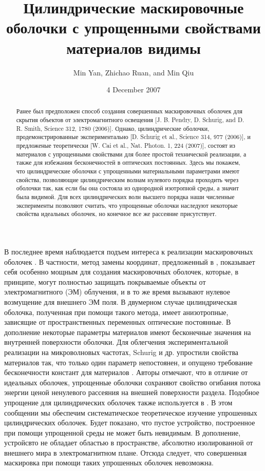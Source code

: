 \documentclass[12pt]{article}
\title{Цилиндрические маскировочные оболочки с упрощенными свойствами
  материалов видимы}
\author{Min Yan, Zhichao Ruan, and Min Qiu}
\date{4 December 2007}
\begin{document}
\maketitle
\begin{abstract}
  Ранее был предположен способ создания совершенных маскировочных оболочек
  для скрытия объектов от электромагнитного освещения [J. B. Pendry,
    D. Schurig, and D. R. Smith, Science 312, 1780 (2006)]. Однако,
  цилиндрические оболочки, продемонстрированные экспериментально [D. Schurig et
    al., Science 314, 977 (2006)], и предложеные теоретически [W. Cai
    et al., Nat. Photon. 1, 224 (2007)], состоят из материалов с
  упрощенными свойствами для более простой технической реализации, а
  также для избежания бесконечностей в оптических постоянных. Здесь мы
  покажем, что цилиндрические оболочки с упрощенными материальными параметрами
   имеют свойства,
  позволяющие цилиндрическим волнам нулевого порядка проходить через оболочки так,
  как если бы она состояла из однородной изотропной среды, а значит была
  видимой. Для всех цилиндрических волн высшего порядка наши численные
  эксперименты позволяют считать, что упрощенные оболочки наследуют
  некоторые свойства идеальных оболочек, но конечное все же рассеяние
  присутствует.
\end{abstract}

В последнее время наблюдается подъем интереса к реализации
маскировочных оболочек \cite{1, 2, 3, 4, 5, 6, 7, 8}. В частности,
метод замены координат, предложенный в \cite{4}, показывает себя
особенно мощным для создания маскировочных оболочек, которые, в
принципе, могут полностью защищать покрываемые объекты от
электромагнитного (ЭМ) облучения, и в то же время вызывают нулевое
возмущение для внешнего ЭМ поля. В двумерном случае цилиндрическая
оболочка, полученная при помощи такого метода, имеет анизотропные,
зависящие от пространственных переменных оптические постоянные. В
дополнение некоторые параметры материалов имеют бесконечные значения
на внутренней поверхности оболочки. Для облегчения экспериментальной
реализации на микроволновых частотах, Schurig и др. упростили свойства
материалов так, что только один параметр непостоянен, и опущено требование
бесконечности констант для материалов \cite{9}. Авторы отмечают,
что в отличие от идеальных оболочек, упрощенные оболочки сохраняют
свойство огибания потока энергии ценой ненулевого рассеяния на внешней
поверхности раздела. Подобное упрощение для цилиндрических оболочек
также используется в \cite{10}. В этом сообщении мы обеспечим
систематическое теоретическое изучение упрошенных цилиндрических
оболочек. Будет показано, что пустое устройство, построенное при
помощи упрощенной среды не может быть невидимым. В дополнение, устройсвто
не обладает областью в пространстве, абсолютно изолированной от
внешнего мира в электромагнитном плане. Отсюда следует, что совершенная
маскировка при помощи таких упрошенных оболочек невозможна.
\end{document}
